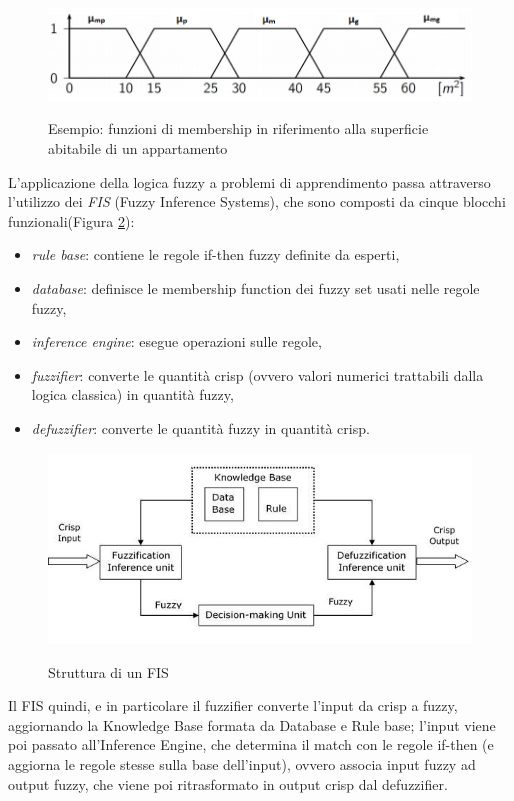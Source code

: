\documentclass[oneside, openany]{book}
\begin{document}
		
		\begin{figure}[h]
			\centering
			{\includegraphics[width=.80\textwidth]{mem2.png}} \quad
			\caption{Esempio: funzioni di membership in riferimento alla superficie abitabile di un appartamento}
			\label{fig:mem2}
		\end{figure}
		 
		L'applicazione della logica fuzzy a problemi di apprendimento passa attraverso l'utilizzo dei \textit{FIS} (Fuzzy Inference Systems), che sono composti da cinque blocchi funzionali(Figura \ref{fig:fis}): 
		\begin{itemize}
			\item{\textit{rule base}}: contiene le regole if-then fuzzy definite da esperti,
			\item{\textit{database}}: definisce le membership function dei fuzzy set usati nelle regole fuzzy,
			\item{\textit{inference engine}}: esegue operazioni sulle regole,
			\item{\textit{fuzzifier}}: converte le quantità crisp (ovvero valori numerici trattabili dalla logica classica) in quantità fuzzy,
			\item{\textit{defuzzifier}}: converte le quantità fuzzy in quantità crisp.
		\end{itemize}
		\begin{figure}[h]
			\centering
			{\includegraphics[width=.80\textwidth]{fis.jpg}} \quad
			\caption{Struttura di un FIS}
			\label{fig:fis}
		\end{figure}
	
		Il FIS quindi, e in particolare il fuzzifier converte l'input da crisp a fuzzy, aggiornando la Knowledge Base formata da Database e Rule base; l'input viene poi passato all'Inference Engine, che determina il match con le regole if-then (e aggiorna le regole stesse sulla base dell'input), ovvero associa input fuzzy ad output fuzzy, che viene poi ritrasformato in output crisp dal defuzzifier.
\end{document}
